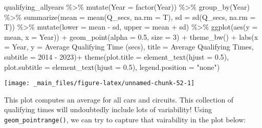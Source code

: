 \documentclass[
]{book}
\newenvironment{Shaded}{\begin{snugshade}}{\end{snugshade}}
\newcommand{\AttributeTok}[1]{\textcolor[rgb]{0.77,0.63,0.00}{#1}}
\newcommand{\DecValTok}[1]{\textcolor[rgb]{0.00,0.00,0.81}{#1}}
\newcommand{\FloatTok}[1]{\textcolor[rgb]{0.00,0.00,0.81}{#1}}
\newcommand{\FunctionTok}[1]{\textcolor[rgb]{0.00,0.00,0.00}{#1}}
\newcommand{\NormalTok}[1]{#1}
\newcommand{\SpecialCharTok}[1]{\textcolor[rgb]{0.00,0.00,0.00}{#1}}
\newcommand{\StringTok}[1]{\textcolor[rgb]{0.31,0.60,0.02}{#1}}
\begin{document}
\begin{Shaded}
\begin{Highlighting}[]
\NormalTok{qualifying\_allyears }\SpecialCharTok{\%\textgreater{}\%}
  \FunctionTok{mutate}\NormalTok{(}\AttributeTok{Year =} \FunctionTok{factor}\NormalTok{(Year)) }\SpecialCharTok{\%\textgreater{}\%}
  \FunctionTok{group\_by}\NormalTok{(Year) }\SpecialCharTok{\%\textgreater{}\%}
  \FunctionTok{summarize}\NormalTok{(}\AttributeTok{mean =} \FunctionTok{mean}\NormalTok{(Q\_secs, }\AttributeTok{na.rm =}\NormalTok{ T),}
            \AttributeTok{sd =} \FunctionTok{sd}\NormalTok{(Q\_secs, }\AttributeTok{na.rm =}\NormalTok{ T)) }\SpecialCharTok{\%\textgreater{}\%} 
  \FunctionTok{mutate}\NormalTok{(}\AttributeTok{lower =}\NormalTok{ mean  }\SpecialCharTok{{-}}\NormalTok{ sd,}
         \AttributeTok{upper =}\NormalTok{ mean }\SpecialCharTok{+}\NormalTok{ sd) }\SpecialCharTok{\%\textgreater{}\%}
  \FunctionTok{ggplot}\NormalTok{(}\FunctionTok{aes}\NormalTok{(}\AttributeTok{y =}\NormalTok{ mean, }\AttributeTok{x =}\NormalTok{ Year)) }\SpecialCharTok{+}
  \FunctionTok{geom\_point}\NormalTok{(}\AttributeTok{alpha =} \FloatTok{0.5}\NormalTok{, }\AttributeTok{size =} \DecValTok{3}\NormalTok{) }\SpecialCharTok{+}
  \FunctionTok{theme\_bw}\NormalTok{() }\SpecialCharTok{+}
  \FunctionTok{labs}\NormalTok{(}\AttributeTok{x =} \StringTok{\textquotesingle{}Year\textquotesingle{}}\NormalTok{,}
       \AttributeTok{y =} \StringTok{\textquotesingle{}Average Qualifying Time (secs)\textquotesingle{}}\NormalTok{,}
       \AttributeTok{title =} \StringTok{\textquotesingle{}Average Qualifying Times\textquotesingle{}}\NormalTok{,}
       \AttributeTok{subtitle =} \StringTok{\textquotesingle{}2014 {-} 2023\textquotesingle{}}\NormalTok{)}\SpecialCharTok{+}
  \FunctionTok{theme}\NormalTok{(}\AttributeTok{plot.title =} \FunctionTok{element\_text}\NormalTok{(}\AttributeTok{hjust =} \FloatTok{0.5}\NormalTok{),}
        \AttributeTok{plot.subtitle =} \FunctionTok{element\_text}\NormalTok{(}\AttributeTok{hjust =} \FloatTok{0.5}\NormalTok{),}
        \AttributeTok{legend.position =} \StringTok{"none"}\NormalTok{)}
\end{Highlighting}
\end{Shaded}

\begin{center}\texttt{[image: \_main\_files/figure-latex/unnamed-chunk-52-1]} \end{center}

This plot computes an average for all cars and circuits. This collection of qualifying times will undoubtedly include lots of variability! Using \texttt{geom\_pointrange()}, we can try to capture that vairability in the plot below:
\end{document}
